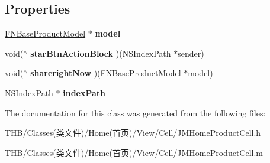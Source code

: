 \subsection*{Properties}
\begin{DoxyCompactItemize}
\item 
\mbox{\label{interface_j_m_home_product_cell_a90f7893889f06ead325811dbf6ff63a4}} 
\mbox{\hyperlink{interface_f_n_base_product_model}{F\+N\+Base\+Product\+Model}} $\ast$ {\bfseries model}
\item 
\mbox{\label{interface_j_m_home_product_cell_a071e200319e3c05c40ed61819e66d522}} 
void($^\wedge$ {\bfseries star\+Btn\+Action\+Block} )(N\+S\+Index\+Path $\ast$sender)
\item 
\mbox{\label{interface_j_m_home_product_cell_a60d40ab6a2fc9043d15be3e740d7c01f}} 
void($^\wedge$ {\bfseries shareright\+Now} )(\mbox{\hyperlink{interface_f_n_base_product_model}{F\+N\+Base\+Product\+Model}} $\ast$model)
\item 
\mbox{\label{interface_j_m_home_product_cell_a8ee86559c1e04f2578c02c9738330c6f}} 
N\+S\+Index\+Path $\ast$ {\bfseries index\+Path}
\end{DoxyCompactItemize}


The documentation for this class was generated from the following files\+:\begin{DoxyCompactItemize}
\item 
T\+H\+B/\+Classes(类文件)/\+Home(首页)/\+View/\+Cell/J\+M\+Home\+Product\+Cell.\+h\item 
T\+H\+B/\+Classes(类文件)/\+Home(首页)/\+View/\+Cell/J\+M\+Home\+Product\+Cell.\+m\end{DoxyCompactItemize}
